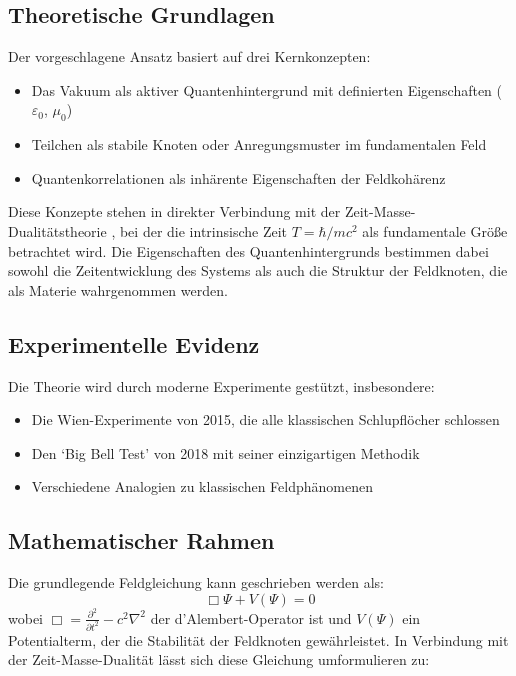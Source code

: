 \documentclass[a4paper,12pt]{article}
\begin{document}
	\subsection{Theoretische Grundlagen}
	
	Der vorgeschlagene Ansatz basiert auf drei Kernkonzepten:
	\begin{itemize}
		\item Das Vakuum als aktiver Quantenhintergrund mit definierten Eigenschaften ($\varepsilon_0$, $\mu_0$)
		\item Teilchen als stabile Knoten oder Anregungsmuster im fundamentalen Feld
		\item Quantenkorrelationen als inhärente Eigenschaften der Feldkohärenz
	\end{itemize}
	
	Diese Konzepte stehen in direkter Verbindung mit der Zeit-Masse-Dualitätstheorie \cite{Pascher2024}, bei der die intrinsische Zeit $T = \hbar/mc^2$ als fundamentale Größe betrachtet wird. Die Eigenschaften des Quantenhintergrunds bestimmen dabei sowohl die Zeitentwicklung des Systems als auch die Struktur der Feldknoten, die als Materie wahrgenommen werden.
	
	\subsection{Experimentelle Evidenz}
	
	Die Theorie wird durch moderne Experimente gestützt, insbesondere:
	\begin{itemize}
		\item Die Wien-Experimente von 2015, die alle klassischen Schlupflöcher schlossen \cite{Giustina2015}
		\item Den `Big Bell Test' von 2018 mit seiner einzigartigen Methodik \cite{BigBellTest2018}
		\item Verschiedene Analogien zu klassischen Feldphänomenen
	\end{itemize}
	
	\subsection{Mathematischer Rahmen}
	
	Die grundlegende Feldgleichung kann geschrieben werden als:
	\begin{equation}
		\Box \Psi + V(\Psi) = 0
	\end{equation}
	wobei $\Box = \frac{\partial^2}{\partial t^2} - c^2 \nabla^2$ der d'Alembert-Operator ist und $V(\Psi)$ ein Potentialterm, der die Stabilität der Feldknoten gewährleistet. In Verbindung mit der Zeit-Masse-Dualität lässt sich diese Gleichung umformulieren zu:
	
\end{document}
